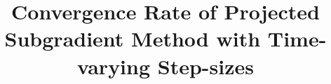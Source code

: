 %
%
%
%
%
%
\RequirePackage{fix-cm}
%
\documentclass[smallextended]{svjour3}       %
%
\smartqed  %
%
\usepackage{graphicx}
\usepackage {color}
\usepackage {tikz}


%
%
%
%
%
\smartqed  %
%
\usepackage{graphicx}
\usepackage{amsmath}
\usepackage{amssymb}
\usepackage{mathtools}
\def\ST{\songti\rm\relax}
\def\R{{\mathbb R}}
\def\Z{{\mathbb Z}}
\def\ST{{\rm s.t.}}
\def\argmin{{\rm argmin}}



\newtheorem{assumption}{Assumption}
\newtheorem{observation}{Observation}


\title{Convergence Rate of Projected Subgradient Method with Time-varying Step-sizes}

